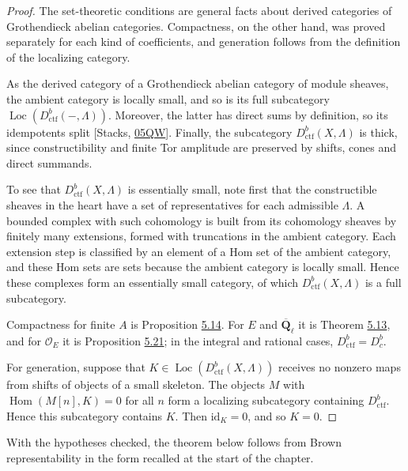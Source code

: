 \documentclass[11pt]{article}
\providecommand{\Dbc}{}\renewcommand{\Dbc}{D^b_c}
\providecommand{\Hom}{}\renewcommand{\Hom}{\operatorname{Hom}}
\providecommand{\Loc}{}\renewcommand{\Loc}{\operatorname{Loc}}
\begin{document}
\begin{proof}[{Proof}]\label{bp504}%
The set-theoretic conditions are general facts about derived categories of Grothendieck abelian categories. Compactness, on the other hand, was proved separately for each kind of coefficients, and generation follows from the definition of the localizing category.

As the derived category of a Grothendieck abelian category of module sheaves, the ambient category is locally small, and so is its full subcategory \(\Loc(D^b_{\mathrm{ctf}}(-,\Lambda))\). Moreover, the latter has direct sums by definition, so its idempotents split [Stacks, \href{https://stacks.math.columbia.edu/tag/05QW}{05QW}]. Finally, the subcategory \(D^b_{\mathrm{ctf}}(X,\Lambda)\) is thick, since constructibility and finite Tor amplitude are preserved by shifts, cones and direct summands.

To see that \(D^b_{\mathrm{ctf}}(X,\Lambda)\) is essentially small, note first that the constructible sheaves in the heart have a set of representatives for each admissible \(\Lambda\). A bounded complex with such cohomology is built from its cohomology sheaves by finitely many extensions, formed with truncations in the ambient category. Each extension step is classified by an element of a Hom set of the ambient category, and these Hom sets are sets because the ambient category is locally small. Hence these complexes form an essentially small category, of which \(D^b_{\mathrm{ctf}}(X,\Lambda)\) is a full subcategory.

Compactness for finite \(A\) is Proposition \hyperref[bp451]{5.14}. For \(E\) and \(\overline{\mathbf Q}_\ell\) it is Theorem \hyperref[bp446]{5.13}, and for \(\mathcal O_E\) it is Proposition \hyperref[bp477]{5.21}; in the integral and rational cases, \(D^b_{\mathrm{ctf}}=\Dbc\).

For generation, suppose that \(K\in\Loc(D^b_{\mathrm{ctf}}(X,\Lambda))\) receives no nonzero maps from shifts of objects of a small skeleton. The objects \(M\) with \(\Hom(M[n],K)=0\) for all \(n\) form a localizing subcategory containing \(D^b_{\mathrm{ctf}}\). Hence this subcategory contains \(K\). Then \(\mathrm{id}_K=0\), and so \(K=0\).
\end{proof}

\label{bp505}%
With the hypotheses checked, the theorem below follows from Brown representability in the form recalled at the start of the chapter.
\end{document}
